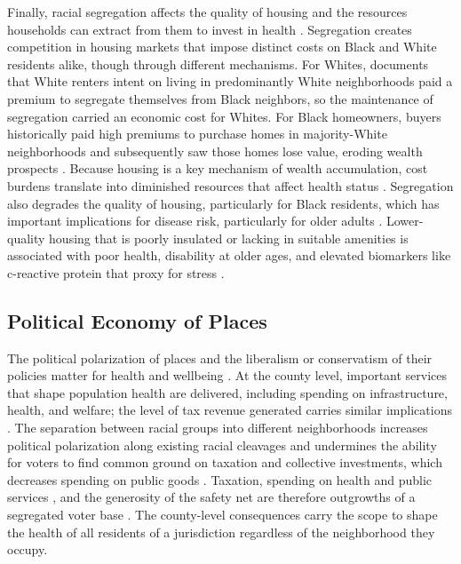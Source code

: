 \documentclass[11pt]{article}
\begin{document}
Finally, racial segregation affects the quality of housing and the resources households can extract from them to invest in health \citep{breen_longevity_2024}. Segregation creates competition in housing markets that impose distinct costs on Black and White residents alike, though through different mechanisms. For Whites, \citet{daniels_influence_1975} documents that White renters intent on living in predominantly White neighborhoods paid a premium to segregate themselves from Black neighbors, so the maintenance of segregation carried an economic cost for Whites. For Black homeowners, buyers historically paid high premiums to purchase homes in majority-White neighborhoods and subsequently saw those homes lose value, eroding wealth prospects \citep{akbar_racial_2025}. Because housing is a key mechanism of wealth accumulation, cost burdens translate into diminished resources that affect health status \citep{hurd_health_2003,wang_housing_2026}. Segregation also degrades the quality of housing, particularly for Black residents, which has important implications for disease risk, particularly for older adults \citep{evans_residential_2024}. Lower-quality housing that is poorly insulated or lacking in suitable amenities is associated with poor health, disability at older ages, and elevated biomarkers like c-reactive protein that proxy for stress \citep{wang_housing_2026,clair_housing_2019}.

\subsection{Political Economy of Places}

The political polarization of places and the liberalism or conservatism of their policies matter for health and wellbeing \citep{montez_us_2026,torche_political_2021}. At the county level, important services that shape population health are delivered, including spending on infrastructure, health, and welfare; the level of tax revenue generated carries similar implications \citep{manduca_tax_2025,debenedictis-kessner_politics_2020}. The separation between racial groups into different neighborhoods increases political polarization along existing racial cleavages and undermines the ability for voters to find common ground on taxation and collective investments, which decreases spending on public goods \citep{trounstine_segregation_2016,chyn_effects_2026}. Taxation, spending on health and public services \citep{alesina_public_1999}, and the generosity of the safety net are therefore outgrowths of a segregated voter base \citep{debenedictis-kessner_politics_2020, tausanovitch_representation_2014}. The county-level consequences carry the scope to shape the health of all residents of a jurisdiction regardless of the neighborhood they occupy.
\end{document}
